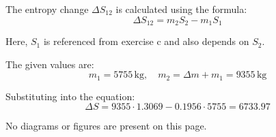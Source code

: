 The entropy change \( \Delta S_{12} \) is calculated using the formula:  
\[
\Delta S_{12} = m_2 S_2 - m_1 S_1
\]  

Here, \( S_1 \) is referenced from exercise c and also depends on \( S_2 \).  

The given values are:  
\[
m_1 = 5755 \, \text{kg}, \quad m_2 = \Delta m + m_1 = 9355 \, \text{kg}
\]  

Substituting into the equation:  
\[
\Delta S = 9355 \cdot 1.3069 - 0.1956 \cdot 5755 = 6733.97
\]  

No diagrams or figures are present on this page.